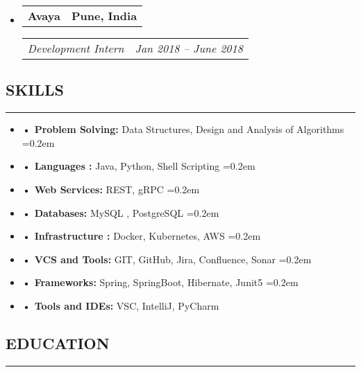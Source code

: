 \documentclass[a4paper]{article}
\makeatletter
\newcommand{\headerrow}[2]
{\begin{tabular*}{\linewidth}{l@{\extracolsep{\fill}}r}
#1 &
#2 \\
\end{tabular*}}
\makeatother
\begin{document}
\begin{itemize}[leftmargin=1em]
	      	      
	      	      	      	      
	\item
	      \headerrow
	      {\textbf{ Avaya }}
	      {\textbf{Pune, India}}
	      \headerrow
	      {\emph{Development Intern}}
	      {\emph{Jan 2018 -- June 2018}}
	      	      	      	      
\end{itemize}


\subsection*{\large SKILLS}
\hrule
\vspace{1em}

\begin{itemize} [leftmargin=1em,noitemsep]
	\parskip=0.2em
	\item \textbf{• Problem Solving: }
	      Data Structures, Design and Analysis of Algorithms
	      \parskip=0.2em
	\item \textbf{• Languages :}
	      Java, Python, Shell  Scripting
	      \parskip=0.2em
	\item \textbf{• Web Services:}
	      REST, gRPC
	      \parskip=0.2em
	\item \textbf{• Databases: }
	      MySQL , PostgreSQL
	      \parskip=0.2em
	\item \textbf{• Infrastructure :}
	      Docker, Kubernetes, AWS
	      \parskip=0.2em
	\item \textbf{• VCS and Tools:}
	      GIT, GitHub, Jira, Confluence, Sonar
	      \parskip=0.2em
	\item \textbf{• Frameworks:}
	      Spring, SpringBoot, Hibernate, Junit5
	      \parskip=0.2em
	\item \textbf{• Tools and IDEs:}
	      VSC, IntelliJ, PyCharm
	      
\end{itemize}


\subsection*{\large EDUCATION}
\hrule
\vspace{1em}
\end{document}
